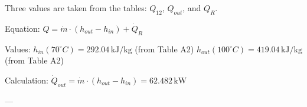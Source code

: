 Three values are taken from the tables: \( Q_{12} \), \( Q_{out} \), and \( Q_{R} \).  

Equation:  
\( Q = \dot{m} \cdot (h_{out} - h_{in}) + \dot{Q}_R \)  

Values:  
\( h_{in}(70^\circ C) = 292.04 \, \text{kJ/kg} \) (from Table A2)  
\( h_{out}(100^\circ C) = 419.04 \, \text{kJ/kg} \) (from Table A2)  

Calculation:  
\( \dot{Q}_{out} = \dot{m} \cdot (h_{out} - h_{in}) = 62.482 \, \text{kW} \)  

---